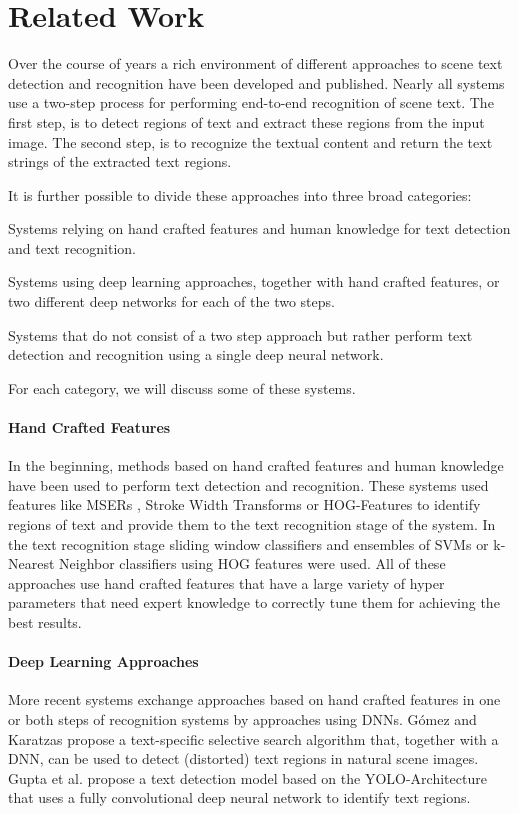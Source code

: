 \documentclass[letterpaper]{article}
\begin{document}
	\section{Related Work}
	\label{sec:related_work}

	Over the course of years a rich environment of different approaches to scene text detection and recognition have been developed and published.
	Nearly all systems use a two-step process for performing end-to-end recognition of scene text.
	The first step, is to detect regions of text and extract these regions from the input image.
	The second step, is to recognize the textual content and return the text strings of the extracted text regions.


	It is further possible to divide these approaches into three broad categories:
	\begin{enumerate*}[label={(\arabic*)}]
		\item Systems relying on hand crafted features and human knowledge for text detection and text recognition.
		\item Systems using deep learning approaches, together with hand crafted features, or two different deep networks for each of the two steps.
		\item Systems that do not consist of a two step approach but rather perform text detection and recognition using a single deep neural network.
	\end{enumerate*}
	For each category, we will discuss some of these systems.

	\paragraph{Hand Crafted Features}
		In the beginning, methods based on hand crafted features and human knowledge have been used to perform text detection and recognition.
		These systems used features like MSERs \cite{Neumann2010Method}, Stroke Width Transforms \cite{Epshtein2010Detecting} or HOG-Features \cite{Wang2011EndToEnd} to identify regions of text and provide them to the text recognition stage of the system.
		In the text recognition stage sliding window classifiers \cite{Mishra2012Scene} and ensembles of SVMs \cite{Yao2014Strokelets} or k-Nearest Neighbor classifiers using HOG features \cite{Wang2010Word} were used.
		All of these approaches use hand crafted features that have a large variety of hyper parameters that need expert knowledge to correctly tune them for achieving the best results.

	\paragraph{Deep Learning Approaches}
	More recent systems exchange approaches based on hand crafted features in one or both steps of recognition systems by approaches using \acp{DNN}.
	Gómez and Karatzas \cite{Gomez2017Textproposals} propose a text-specific selective search algorithm that, together with a \ac{DNN}, can be used to detect (distorted) text regions in natural scene images.
	Gupta et al. \cite{Gupta2016Syntheticb} propose a text detection model based on the YOLO-Architecture \cite{Redmon2016You} that uses a fully convolutional deep neural network to identify text regions.
\end{document}
